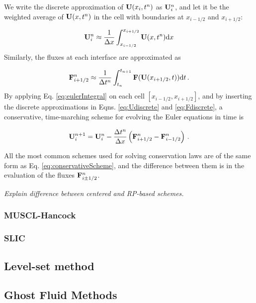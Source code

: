 \documentclass[final,3p,twocolumn,times]{elsarticle}
\begin{document}
We write the discrete
approximation of ${\bf U}(x_i, t^n)$ as ${\bf U}_i^n$, and let it be the
weighted average of ${\bf U}(x,t^n)$ in the cell with boundaries at
$x_{i-1/2}$ and $x_{i+1/2}$: 

\begin{equation}
    {\bf U}_i^n \approx \frac{1}{\Delta x} \int_{x_{i-1/2}}^{x_{i+1/2}} {\bf
    U}(x,t^n) {\rm d}x 
    \label{eq:Udiscrete}
\end{equation}
%
Similarly, the fluxes at each interface are approximated as 

\begin{equation}
    {\bf F}_{i+1/2}^n \approx \frac{1}{\Delta t^n} 
    \int_{t_{n}}^{t_{n+1}} {\bf F}({\bf U}(x_{i+1/2},t)) {\rm d}t \,. 
    \label{eq:Fdiscrete}
\end{equation}
%
By applying Eq. \eqref{eq:eulerIntegral} on each cell $[x_{i-1/2},x_{i+1/2}]$,
and by inserting the discrete approximations in Eqns. \eqref{eq:Udiscrete} and
\eqref{eq:Fdiscrete}, a conservative, time-marching scheme for evolving the
Euler equations in time is 

\begin{equation}
    {\bf U}_i^{n+1} = {\bf U}_i^n - \frac{\Delta t^n}{\Delta x} \left(
    {\bf F}_{i+1/2}^n - {\bf F}_{i-1/2}^n \right) \,. 
    \label{eq:conservativeScheme}
\end{equation}

All the most common schemes used for solving conservation laws are of the same
form as Eq. \eqref{eq:conservativeScheme}, and the difference between them is
in the evaluation of the fluxes ${\bf F}_{i\pm 1/2}^n$. 

\emph{Explain difference between centered and RP-based schemes. }

\subsubsection{MUSCL-Hancock}
\label{subsubsec:muscl}

\subsubsection{SLIC}
\label{subsubsec:slic}

\subsection{Level-set method}
\label{subsec:levelset}

\subsection{Ghost Fluid Methods}
\label{subsec:ghostfluid}
\end{document}
